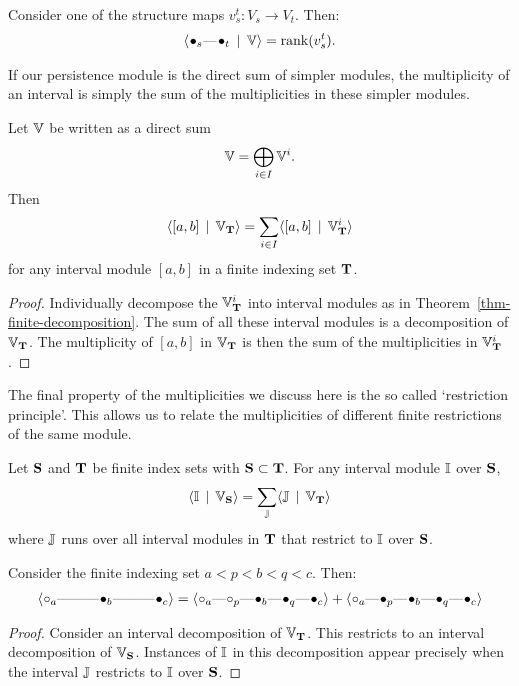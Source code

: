 \begin{example}
Consider one of the structure maps $v_s^t : V_s \to V_t$. Then:
\begin{align*}
\langle \qon{s} \qem \qon{t} \st \V \rangle = \rank(v_s^t).
\end{align*}
\end{example}

If our persistence module is the direct sum of simpler modules, the multiplicity of an interval is simply the sum of the multiplicities in these simpler modules.

\begin{proposition}
\label{quiver-direct-sums}
Let $\V$ be written as a direct sum
\begin{align*}
\V = \bigoplus_{i \in I} \V^i.
\end{align*}
Then
\begin{align*}
\langle [a, b] \st \V_\T \rangle = \sum_{i\in I} \langle [a, b] \st \V_\T^i \rangle
\end{align*}
for any interval module $[a, b]$ in a finite indexing set $\T$.
\end{proposition}
\begin{proof}
Individually decompose the $\V_\T^i$ into interval modules as in Theorem~\ref{thm-finite-decomposition}. The sum of all these interval modules is a decomposition of $\V_\T$. The multiplicity of $[a, b]$ in $\V_\T$ is then the sum of the multiplicities in $\V_\T^i$.
\end{proof}

The final property of the multiplicities we discuss here is the so called `restriction principle'. This allows us to relate the multiplicities of different finite restrictions of the same module.

\begin{proposition}
Let $\S$ and $\T$ be finite index sets with $\S \subset \T$. For any interval module $\I$ over $\S$,
\begin{align*}
\langle \I \st \V_\S \rangle = \sum_\J \langle \J \st \V_\T \rangle
\end{align*}
where $\J$ runs over all interval modules in $\T$ that restrict to $\I$ over $\S$.
\end{proposition}

\begin{example}
Consider the finite indexing set $a < p < b < q < c$. Then:
\begin{align*}
\langle \qoff{a} \qem \qno \qem \qon{b} \qem \qno \qem \qon{c} \rangle = \langle \qoff{a} \qem \qoff{p} \qem \qon{b} \qem \qon{q} \qem \qon{c} \rangle + \langle \qoff{a} \qem \qon{p} \qem \qon{b} \qem \qon{q} \qem \qon{c} \rangle
\end{align*}
\end{example}

\begin{proof}
Consider an interval decomposition of $\V_\T$. This restricts to an interval decomposition of $\V_\S$. Instances of $\I$ in this decomposition appear precisely when the interval $\J$ restricts to $\I$ over $\S$.
\end{proof}

